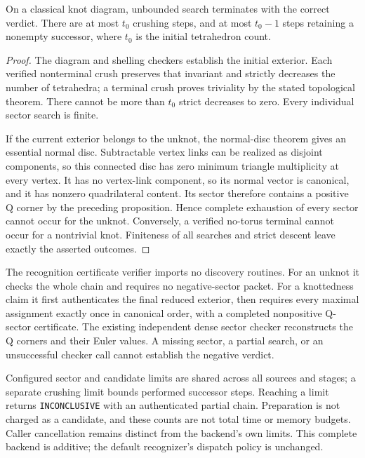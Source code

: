 \begin{proposition}
On a classical knot diagram, unbounded search terminates with the correct
verdict.  There are at most $t_0$ crushing steps, and at most $t_0-1$ steps
retaining a nonempty successor, where $t_0$ is the initial tetrahedron count.
\end{proposition}
\begin{proof}
The diagram and shelling checkers establish the initial exterior.  Each
verified nonterminal crush preserves that invariant and strictly decreases
the number of tetrahedra; a terminal crush proves triviality by the stated
topological theorem.  There cannot be more than $t_0$ strict decreases to
zero.  Every individual sector search is finite.

If the current exterior belongs to the unknot, the normal-disc theorem gives
an essential normal disc.  Subtractable vertex links can be realized as
disjoint components, so this connected disc has zero minimum triangle
multiplicity at every vertex.  It has no vertex-link component, so its normal
vector is canonical, and it has nonzero quadrilateral content.  Its sector
therefore contains a positive Q corner by the preceding proposition.  Hence
complete exhaustion of every sector cannot occur for the unknot.  Conversely,
a verified no-torus terminal cannot occur for a nontrivial knot.  Finiteness
of all searches and strict descent leave exactly the asserted outcomes.
\end{proof}

The recognition certificate verifier imports no discovery routines.  For
an unknot it checks the whole chain and requires no negative-sector packet.
For a knottedness claim it first authenticates the final reduced exterior,
then requires every maximal assignment exactly once in canonical order,
with a completed nonpositive Q-sector certificate.  The existing independent
dense sector checker reconstructs the Q corners and their Euler values.
A missing sector, a partial search, or an unsuccessful checker call cannot
establish the negative verdict.

Configured sector and candidate limits are shared across all sources and
stages; a separate crushing limit bounds performed successor steps.  Reaching
a limit returns \texttt{INCONCLUSIVE} with an authenticated partial chain.
Preparation is not charged as a candidate, and these counts are not total
time or memory budgets.  Caller cancellation remains distinct from the
backend's own limits.  This complete backend is additive; the default
recognizer's dispatch policy is unchanged.

